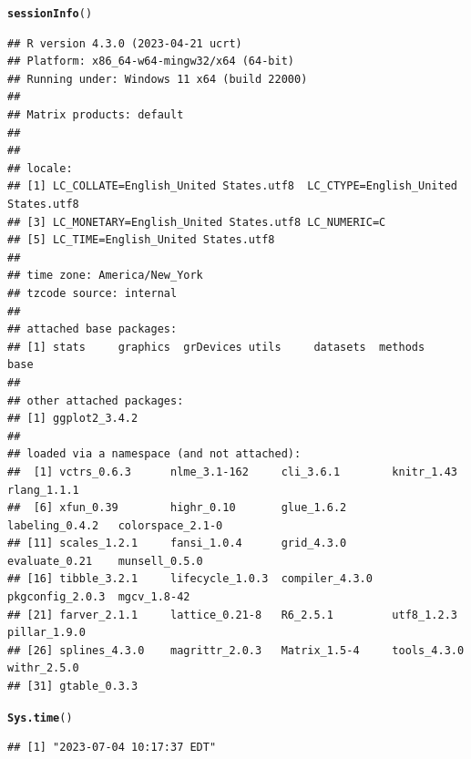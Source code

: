 \documentclass{article}\usepackage[]{graphicx}\usepackage[]{xcolor}
\makeatletter
\newcommand{\hlstd}[1]{\textcolor[rgb]{0.345,0.345,0.345}{#1}}%
\newcommand{\hlkwd}[1]{\textcolor[rgb]{0.737,0.353,0.396}{\textbf{#1}}}%
\newenvironment{kframe}{%
 \def\at@end@of@kframe{}%
 \ifinner\ifhmode%
  \def\at@end@of@kframe{\end{minipage}}%
  \begin{minipage}{\columnwidth}%
 \fi\fi%
 \def\FrameCommand##1{\hskip\@totalleftmargin \hskip-\fboxsep
 \colorbox{shadecolor}{##1}\hskip-\fboxsep
     \hskip-\linewidth \hskip-\@totalleftmargin \hskip\columnwidth}%
 \MakeFramed {\advance\hsize-\width
   \@totalleftmargin\z@ \linewidth\hsize
   \@setminipage}}%
 {\par\unskip\endMakeFramed%
 \at@end@of@kframe}
\newenvironment{knitrout}{}{} %
\makeatother
\begin{document}
\begin{knitrout}
\color{fgcolor}\begin{kframe}
\begin{alltt}
\hlkwd{sessionInfo}\hlstd{()}
\end{alltt}
\begin{verbatim}
## R version 4.3.0 (2023-04-21 ucrt)
## Platform: x86_64-w64-mingw32/x64 (64-bit)
## Running under: Windows 11 x64 (build 22000)
## 
## Matrix products: default
## 
## 
## locale:
## [1] LC_COLLATE=English_United States.utf8  LC_CTYPE=English_United States.utf8   
## [3] LC_MONETARY=English_United States.utf8 LC_NUMERIC=C                          
## [5] LC_TIME=English_United States.utf8    
## 
## time zone: America/New_York
## tzcode source: internal
## 
## attached base packages:
## [1] stats     graphics  grDevices utils     datasets  methods   base     
## 
## other attached packages:
## [1] ggplot2_3.4.2
## 
## loaded via a namespace (and not attached):
##  [1] vctrs_0.6.3      nlme_3.1-162     cli_3.6.1        knitr_1.43       rlang_1.1.1     
##  [6] xfun_0.39        highr_0.10       glue_1.6.2       labeling_0.4.2   colorspace_2.1-0
## [11] scales_1.2.1     fansi_1.0.4      grid_4.3.0       evaluate_0.21    munsell_0.5.0   
## [16] tibble_3.2.1     lifecycle_1.0.3  compiler_4.3.0   pkgconfig_2.0.3  mgcv_1.8-42     
## [21] farver_2.1.1     lattice_0.21-8   R6_2.5.1         utf8_1.2.3       pillar_1.9.0    
## [26] splines_4.3.0    magrittr_2.0.3   Matrix_1.5-4     tools_4.3.0      withr_2.5.0     
## [31] gtable_0.3.3
\end{verbatim}
\begin{alltt}
\hlkwd{Sys.time}\hlstd{()}
\end{alltt}
\begin{verbatim}
## [1] "2023-07-04 10:17:37 EDT"
\end{verbatim}
\end{kframe}
\end{knitrout}
\end{document}
